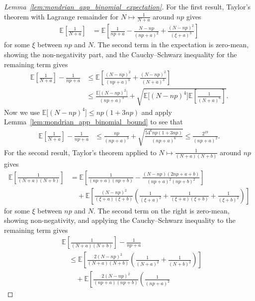 \documentclass[11pt,lof]{puthesis}
\newcommand{\E}{\ensuremath{\mathbb{E}}}
\theoremstyle{break}
\theoremstyle{proof}
\newtheorem{proof}{Proof}
\begin{document}
\begin{proof}[Lemma~\ref{lem:mondrian_app_binomial_expectation}]

For the first result,
Taylor's theorem with Lagrange remainder
for $N \mapsto \frac{1}{N+a}$ around $n p$ gives
%
\begin{align*}
\E \left[
\frac{1}{N+a}
\right]
&=
\E \left[
\frac{1}{n p+a}
- \frac{N - n p}{(n p+a)^2}
+ \frac{(N - n p)^2}{(\xi+a)^3}
\right]
\end{align*}
%
for some $\xi$ between $n p$ and $N$. The second term in the expectation
is zero-mean, showing the non-negativity part, and the
Cauchy--Schwarz inequality for the remaining term gives
%
\begin{align*}
\E \left[
\frac{1}{N+a}
\right]
- \frac{1}{n p+a}
&\leq
\E \left[
\frac{(N - n p)^2}{(n p+a)^3}
+ \frac{(N - n p)^2}{(N+a)^3}
\right] \\
&\leq
\frac{\E\big[(N - n p)^2\big]}{(n p+a)^3}
+ \sqrt{
\E\big[(N - n p)^4\big]
\E \left[
\frac{1}{(N+a)^6}
\right]}.
\end{align*}
%
Now we use $\E\big[(N - n p)^4\big] \leq n p(1+3n p)$
and apply Lemma~\ref{lem:mondrian_app_binomial_bound} to see that
%
\begin{align*}
\E \left[
\frac{1}{N+a}
\right]
- \frac{1}{n p+a}
&\leq
\frac{n p}{(n p+a)^3}
+ \sqrt{\frac{54^6 n p(1+3 n p)}{(n p + a)^6}}
\leq
\frac{2^{19}}{(n p+a)^2}.
\end{align*}
%
For the second result,
Taylor's theorem applied to $N \mapsto \frac{1}{(N+a)(N+b)}$
around $n p$ gives
%
\begin{align*}
\E \left[
\frac{1}{(N+a)(N+b)}
\right]
&=
\E \left[
\frac{1}{(n p+a)(n p + b)}
- \frac{(N - n p)(2 n p + a + b)}{(n p + a)^2 (n p + b)^2}
\right] \\
&\quad+
\E \left[
\frac{(N - n p)^2}{(\xi+a)(\xi+b)}
\left(
\frac{1}{(\xi + a)^2}
+ \frac{1}{(\xi + a)(\xi + b)}
+ \frac{1}{(\xi + b)^2}
\right)
\right]
\end{align*}
%
for some $\xi$ between $n p$ and $N$. The second term on the right is
zero-mean, showing non-negativity, and applying the Cauchy--Schwarz
inequality to the remaining term gives
%
\begin{align*}
&\E \left[
\frac{1}{(N+a)(N+b)}
\right]
- \frac{1}{n p+a} \\
&\quad\leq
\E \left[
\frac{2 (N - n p)^2}{(N+a)(N+b)}
\left(
\frac{1}{(N + a)^2}
+ \frac{1}{(N + b)^2}
\right)
\right] \\
&\qquad+
\E \left[
\frac{2 (N - n p)^2}{(n p +a)(n p +b)}
\left(
\frac{1}{(n p + a)^2}

\end{align*}
\end{proof}
\end{document}
